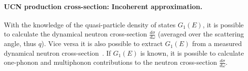 \paragraph{UCN production cross-section: Incoherent approximation.}
With the knowledge of the quasi-particle density of states $G_1(E)$,
it is possible to calculate the dynamical neutron cross-section
$\frac{d\sigma}{d\omega}$ (averaged over the scattering angle, thus
$q$). Vice versa it is also possible to extract $G_1(E)$ from a
measured dynamical neutron cross-section~\cite{Turchin}.  If
$G_1(E)$ is known, it is possible to calculate one-phonon and
multiphonon contributions to the neutron cross-section
$\frac{d\sigma}{d\omega}$.


